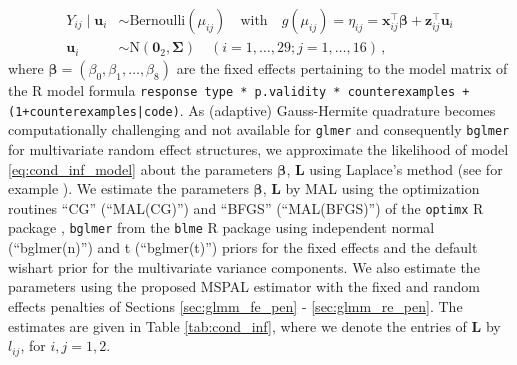 \documentclass[11pt, a4paper]{article}
\newcommand*{\bb}{\boldsymbol}
\theoremstyle{example} \newtheorem{example}{Example}[section]
\theoremstyle{theorem} \newtheorem{theorem}{Theorem}[section]
\def\bbeta{\bb{\beta}}
\def\bu{\bb{u}}
\def\bx{\bb{x}}
\def\bz{\bb{z}}
\def\b0{\bb{0}}
\def\bL{\bb{L}}
\begin{document}
\begin{align}
\label{eq:cond_inf_model} 
  Y_{ij} \mid \bb{u}_i & \sim \text{Bernoulli}(\mu_{ij}) \quad \text{with} \quad
g(\mu_{ij}) = \eta_{ij} = \bx_{ij}^\top \bbeta + \bz_{ij}^\top \bu_i\\
\bu_i & \sim \text{N}(\b0_2, \bb{\Sigma})  \quad (i = 1, \ldots, 29; j = 1, \ldots, 16)\,,
\end{align}
where $\bbeta = (\beta_0,\beta_1,\ldots,\beta_8)$ are the fixed effects pertaining to the model matrix of the R model formula \texttt{response \raisebox{-0.9ex}{\~{}} type * p.validity * counterexamples + (1+counterexamples|code)}. As (adaptive) Gauss-Hermite quadrature becomes computationally challenging and not available for \texttt{glmer} and consequently \texttt{bglmer} for multivariate random effect structures, we approximate the likelihood of model \eqref{eq:cond_inf_model} about the parameters $\bbeta$, $\bL$ using Laplace's method (see for example \cite{pinheiro+bates:1995}). We estimate the parameters $\bbeta$, $\bL$ by MAL using the optimization routines ``CG'' (``MAL(CG)'') and ``BFGS'' (``MAL(BFGS)'') of the \texttt{optimx} R package \citep{nash+varadhan:2011}, \texttt{bglmer} from the \texttt{blme} R package \cite{chung+etal:2013} using independent normal (``bglmer(n)'') and t (``bglmer(t)'') priors for the fixed effects and the default wishart prior for the multivariate variance components. We also estimate the parameters using the proposed MSPAL estimator with the fixed and random effects penalties of Sections \ref{sec:glmm_fe_pen} - \ref{sec:glmm_re_pen}. The estimates are given in Table \ref{tab:cond_inf}, where we denote the entries of $\bL$ by $l_{ij}$, for $i,j=1,2$. 
\end{document}
